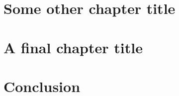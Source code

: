 \documentclass[11pt,openright,oneside,letterpaper,onecolumn]{report}  %
\begin{document}
\chapter{Some other chapter title} 
\label{chapter2}


\chapter{A final chapter title}
\label{chapter3}


\chapter{Conclusion}
\label{conclusion}


%


 
\end{document}
